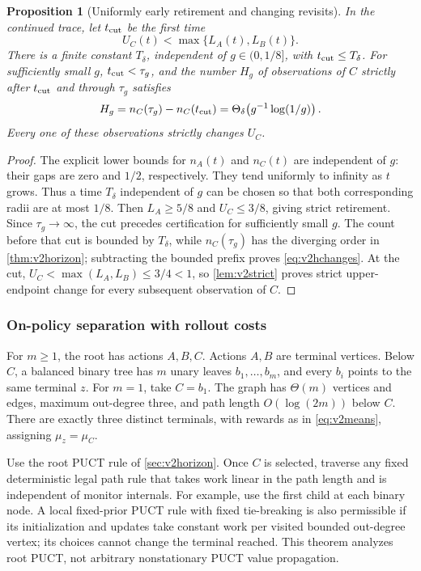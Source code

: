 \documentclass{article}
\theoremstyle{plain}
\newtheorem{proposition}[theorem]{Proposition}
\theoremstyle{definition}
\begin{document}
\begin{proposition}[Uniformly early retirement and changing revisits]
\label{prop:v2postcut}
In the continued trace, let $t_{\rm cut}$ be the first time
\[
 U_C(t)<\max\{L_A(t),L_B(t)\}.
\]
There is a finite constant $T_\delta$, independent of $g\in(0,1/8]$,
with $t_{\rm cut}\le T_\delta$. For sufficiently small $g$,
$t_{\rm cut}<\tau_g$, and the number $H_g$ of observations of $C$
strictly after $t_{\rm cut}$ and through $\tau_g$ satisfies
\begin{equation}
 H_g=n_C(\tau_g)-n_C(t_{\rm cut})
     =\Theta_\delta\!\left(g^{-1}\log(1/g)\right).
 \label{eq:v2hchanges}
\end{equation}
Every one of these observations strictly changes $U_C$.
\end{proposition}
\begin{proof}
The explicit lower bounds for $n_A(t)$ and $n_C(t)$ are independent of
$g$: their gaps are zero and $1/2$, respectively. They tend uniformly
to infinity as $t$ grows. Thus a time $T_\delta$ independent of $g$
can be chosen so that both corresponding radii are at most $1/8$.
Then $L_A\ge5/8$ and $U_C\le3/8$, giving strict retirement.
Since $\tau_g\to\infty$, the cut precedes certification for sufficiently
small $g$. The count before that cut is bounded by $T_\delta$, while
$n_C(\tau_g)$ has the diverging order in \cref{thm:v2horizon}; subtracting
the bounded prefix proves \eqref{eq:v2hchanges}. At the cut,
$U_C<\max(L_A,L_B)\le3/4<1$, so \cref{lem:v2strict} proves strict
upper-endpoint change for every subsequent observation of $C$.
\end{proof}

\subsubsection{On-policy separation with rollout costs}
\label{sec:v2separation}
For $m\ge1$, the root has actions $A,B,C$. Actions $A,B$ are terminal
vertices. Below $C$, a balanced binary tree has $m$ unary leaves
$b_1,\ldots,b_m$, and every $b_i$ points to the same terminal $z$.
For $m=1$, take $C=b_1$. The graph has $\Theta(m)$ vertices and edges,
maximum out-degree three, and path length $O(\log(2m))$ below $C$.
There are exactly three distinct terminals, with rewards as in
\eqref{eq:v2means}, assigning $\mu_z=\mu_C$.

Use the root PUCT rule of \cref{sec:v2horizon}. Once $C$ is selected,
traverse any fixed deterministic legal path rule that takes work linear
in the path length and is independent of monitor internals. For example,
use the first child at each binary node. A local fixed-prior PUCT rule
with fixed tie-breaking is also permissible if its initialization and
updates take constant work per visited bounded out-degree vertex; its
choices cannot change the terminal reached. This theorem analyzes
root PUCT, not arbitrary nonstationary PUCT value propagation.
\end{document}
